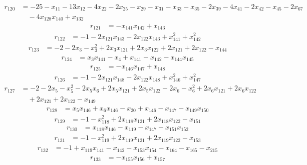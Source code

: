 \begin{align*}
r_{120}&=
-25-x_{11}-13x_{12}-4x_{22}-2x_{25}-x_{29}-x_{31}-x_{33}-x_{35}-2x_{39}-4x_{41}-2x_{42}-x_{45}-2x_{67} \\
&\quad -4x_{128}x_{140}+x_{132}
\end{align*}
\begin{align*}
r_{121}&=
-x_{141}x_{142}+x_{143}
\end{align*}
\begin{align*}
r_{122}&=
-1-2x_{121}x_{143}-2x_{122}x_{143}+x_{141}^{2}+x_{142}^{2}
\end{align*}
\begin{align*}
r_{123}&=
-2-2x_{3}-x_{3}^{2}+2x_{3}x_{121}+2x_{3}x_{122}+2x_{121}+2x_{122}-x_{144}
\end{align*}
\begin{align*}
r_{124}&=
x_{3}x_{141}-x_{4}+x_{141}-x_{142}-x_{144}x_{145}
\end{align*}
\begin{align*}
r_{125}&=
-x_{146}x_{147}+x_{148}
\end{align*}
\begin{align*}
r_{126}&=
-1-2x_{121}x_{148}-2x_{122}x_{148}+x_{146}^{2}+x_{147}^{2}
\end{align*}
\begin{align*}
r_{127}&=
-2-2x_{5}-x_{5}^{2}-2x_{5}x_{6}+2x_{5}x_{121}+2x_{5}x_{122}-2x_{6}-x_{6}^{2}+2x_{6}x_{121}+2x_{6}x_{122} \\
&\quad +2x_{121}+2x_{122}-x_{149}
\end{align*}
\begin{align*}
r_{128}&=
x_{5}x_{146}+x_{6}x_{146}-x_{20}+x_{146}-x_{147}-x_{149}x_{150}
\end{align*}
\begin{align*}
r_{129}&=
-1-x_{118}^{2}+2x_{118}x_{121}+2x_{118}x_{122}-x_{151}
\end{align*}
\begin{align*}
r_{130}&=
x_{118}x_{146}-x_{119}-x_{147}-x_{151}x_{152}
\end{align*}
\begin{align*}
r_{131}&=
-1-x_{119}^{2}+2x_{119}x_{121}+2x_{119}x_{122}-x_{153}
\end{align*}
\begin{align*}
r_{132}&=
-1+x_{119}x_{141}-x_{142}-x_{153}x_{154}-x_{164}-x_{165}-x_{215}
\end{align*}
\begin{align*}
r_{133}&=
-x_{155}x_{156}+x_{157}
\end{align*}
